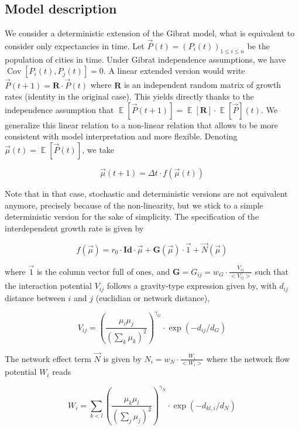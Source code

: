 \documentclass[Royal,sageh,times]{sagej}
\DeclareMathOperator{\Cov}{Cov}
\DeclareMathOperator{\E}{\mathbb{E}}
\newcommand{\Covb}[2]{\ensuremath{\Cov\!\left[#1,#2\right]}}
\newcommand{\Eb}[1]{\ensuremath{\E\!\left[#1\right]}}
\begin{document}
\subsection*{Model description}

We consider a deterministic extension of the Gibrat model, what is equivalent to consider only expectancies in time. Let $\vec{P}(t)=(P_i(t))_{1\leq i\leq n}$ be the population of cities in time. Under Gibrat independence assumptions, we have $\Covb{P_i(t)}{P_j(t)}=0$. A linear extended version would write $\vec{P}(t+1)=\mathbf{R}\cdot \vec{P}(t)$ where $\mathbf{R}$ is an independent random matrix of growth rates (identity in the original case). This yields directly thanks to the independence assumption that $\Eb{\vec{P}(t+1)}=\Eb{\mathbf{R}}\cdot\Eb{\vec{P}}(t)$. We generalize this linear relation to a non-linear relation that allows to be more consistent with model interpretation and more flexible. Denoting $\vec{\mu}(t)=\Eb{\vec{P}(t)}$, we take

\begin{equation}
	\vec{\mu}(t+1)=\Delta t\cdot f(\vec{\mu}(t))
\end{equation}

Note that in that case, stochastic and deterministic versions are not equivalent anymore, precisely because of the non-linearity, but we stick to a simple deterministic version for the sake of simplicity. The specification of the interdependent growth rate is  given by

\begin{equation}
f(\vec{\mu}) = r_0\cdot \mathbf{Id}\cdot \vec{\mu} + \mathbf{G}\left(\vec{\mu}\right)\cdot \vec{1} + \vec{N}\left(\vec{\mu}\right)
\end{equation}


where $\vec{1}$ is the column vector full of ones, and $\mathbf{G} = G_{ij} = w_G\cdot \frac{V_{ij}}{<V_{ij}>}$ such that the interaction potential $V_{ij}$ follows a gravity-type expression given by, with $d_{ij}$ distance between $i$ and $j$ (euclidian or network distance),

\begin{equation}
V_{ij} = \left(\frac{\mu_i\mu_j}{\left(\sum_k{\mu_k}\right)^2}\right)^{\gamma_G}\cdot \exp{\left(-d_{ij}/d_G\right)}
\end{equation}

The network effect term $\vec{N}$ is given by $N_{i} = w_N \cdot \frac{W_i}{<W_i>}$ where the network flow potential $W_i$ reads

\begin{equation}
W_{i} = \sum_{k < l} \left(\frac{\mu_k\mu_l}{\left(\sum_j\mu_j\right)^2}\right)^{\gamma_N} \cdot \exp{\left(-d_{kl,i}/d_N\right)}
\end{equation}
\end{document}
